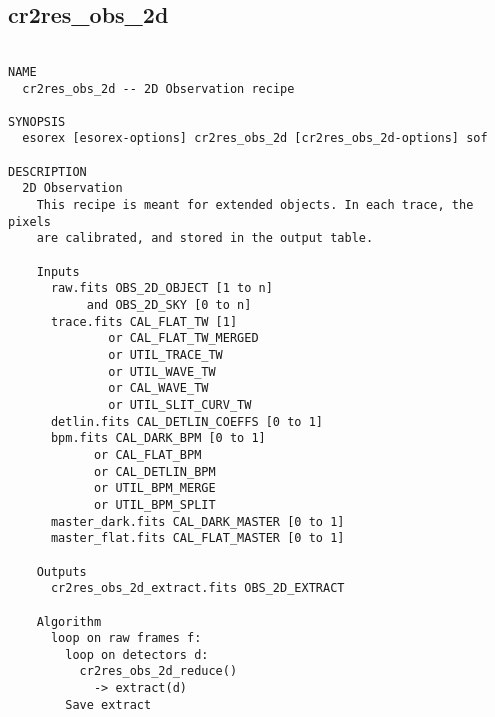 \subsection{cr2res\_obs\_2d}
\begin{verbatim}

NAME
  cr2res_obs_2d -- 2D Observation recipe

SYNOPSIS
  esorex [esorex-options] cr2res_obs_2d [cr2res_obs_2d-options] sof

DESCRIPTION
  2D Observation                                                          
    This recipe is meant for extended objects. In each trace, the pixels  
    are calibrated, and stored in the output table.                       
                                                                          
    Inputs                                                                
      raw.fits OBS_2D_OBJECT [1 to n]                       
           and OBS_2D_SKY [0 to n]                         
      trace.fits CAL_FLAT_TW [1]                       
              or CAL_FLAT_TW_MERGED                    
              or UTIL_TRACE_TW                         
              or UTIL_WAVE_TW                          
              or CAL_WAVE_TW                           
              or UTIL_SLIT_CURV_TW                     
      detlin.fits CAL_DETLIN_COEFFS [0 to 1]           
      bpm.fits CAL_DARK_BPM [0 to 1]                   
            or CAL_FLAT_BPM                            
            or CAL_DETLIN_BPM                          
            or UTIL_BPM_MERGE                          
            or UTIL_BPM_SPLIT                          
      master_dark.fits CAL_DARK_MASTER [0 to 1]        
      master_flat.fits CAL_FLAT_MASTER [0 to 1]        
                                                                          
    Outputs                                                               
      cr2res_obs_2d_extract.fits OBS_2D_EXTRACT        
                                                                          
    Algorithm                                                             
      loop on raw frames f:                                               
        loop on detectors d:                                              
          cr2res_obs_2d_reduce()                                          
            -> extract(d)                                                 
        Save extract                                                      
                                                                          

\end{verbatim}
